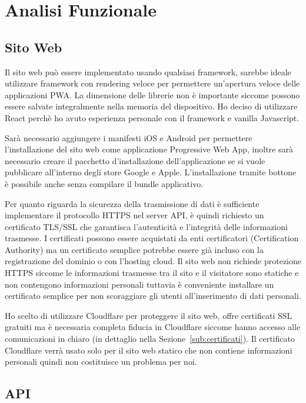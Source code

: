 \section{Analisi Funzionale}%
\label{sec:analisi_funzionale}

\subsection{Sito Web}%
\label{sub:sito_web}

Il sito web pu\`o essere implementato usando qualsiasi framework, sarebbe ideale utilizzare framework con rendering veloce per permettere un'apertura veloce delle applicazioni PWA\@. La dimensione delle librerie non \`e importante siccome possono essere salvate integralmente nella memoria del dispositivo. Ho deciso di utilizzare React perch\`e ho avuto esperienza personale con il framework e vanilla Javascript.

Sar\`a necessario aggiungere i manifesti iOS e Android per permettere l'installazione del sito web come applicazione Progressive Web App, inoltre sar\`a necessario creare il pacchetto d'installazione dell'applicazione se si vuole pubblicare all'interno degli store Google e Apple. L'installazione tramite bottone \`e possibile anche senza compilare il bundle applicativo.

Per quanto riguarda la sicurezza della trasmissione di dati \`e sufficiente implementare il protocollo HTTPS nel server API, \`e quindi richiesto un certificato TLS/SSL che garantisca l'autenticit\`a e l'integrit\`a delle informazioni trasmesse. I certificati possono essere acquistati da enti certificatori (Certification Authority) ma un certificato semplice potrebbe essere gi\`a incluso con la registrazione del dominio o con l'hosting cloud. Il sito web non richiede protezione HTTPS siccome le informazioni trasmesse tra il sito e il visitatore sono statiche e non contengono informazioni personali tuttavia \`e conveniente installare un certificato semplice per non scoraggiare gli utenti all'inserimento di dati personali.

Ho scelto di utilizzare Cloudflare per proteggere il sito web, offre certificati SSL gratuiti ma \`e necessaria completa fiducia in Cloudflare siccome hanno accesso alle comunicazioni in chiaro (in dettaglio nella Sezione~\ref{sub:certificati}). Il certificato Cloudflare verr\`a usato solo per il sito web statico che non contiene informazioni personali quindi non costituisce un problema per noi.

\subsection{API}%
\label{sub:api}

